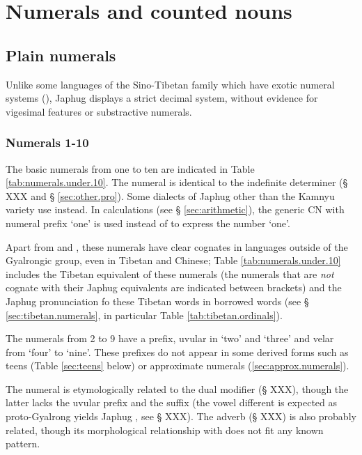 \chapter{Numerals and counted nouns}  \label{chap:numerals}

\section{Plain numerals} \label{sec:plain.numerals}
Unlike some languages of the Sino-Tibetan family which have exotic numeral systems (\citealt{mazaudon02nombre}), Japhug displays a strict decimal system, without evidence for vigesimal features or substractive numerals.


\subsection{Numerals 1-10}  \label{sec:one.to.ten}
The basic numerals from one to ten are indicated in Table \ref{tab:numerals.under.10}. The numeral  is identical to the indefinite determiner (§ XXX and § \ref{sec:other.pro}). Some dialects of Japhug other than the Kamnyu variety use  instead. In calculations (see § \ref{sec:arithmetic}), the generic CN with numeral prefix `one'  is used instead of  to express the number `one'.

Apart from  and , these numerals have clear cognates in languages outside of the Gyalrongic group, even in Tibetan and Chinese; Table \ref{tab:numerals.under.10} includes the Tibetan equivalent of these numerals (the numerals that are \textit{not} cognate with their Japhug equivalents are indicated between brackets) and the Japhug pronunciation fo these Tibetan words in borrowed words (see § \ref{sec:tibetan.numerals}, in particular Table \ref{tab:tibetan.ordinals}).

The numerals from 2 to 9 have a prefix, uvular  in `two' and `three' and velar  from `four' to `nine'. These prefixes do not appear in some derived forms such as teens (Table \ref{sec:teens} below) or approximate numerals (\ref{sec:approx.numerals}).

The numeral  is etymologically related to the dual modifier  (§ XXX), though the latter lacks the uvular prefix and the  suffix (the vowel different is expected as proto-Gyalrong  yields Japhug , see § XXX). The adverb  (§ XXX) is also probably related, though its morphological relationship with  does not fit any known pattern.

